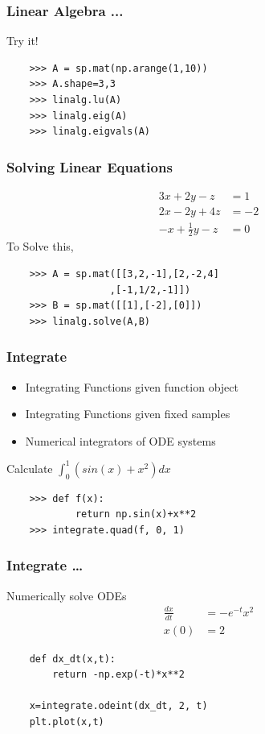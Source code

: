 \documentclass[14pt,compress]{beamer}
\newcounter{time}
\newcommand{\inctime}[1]{\addtocounter{time}{#1}{\tiny \thetime\ m}}
\begin{document}
\begin{frame}[fragile]
  \frametitle{Linear Algebra ...}
  Try it!
  \begin{lstlisting}
    >>> A = sp.mat(np.arange(1,10))
    >>> A.shape=3,3
    >>> linalg.lu(A)
    >>> linalg.eig(A)
    >>> linalg.eigvals(A)
  \end{lstlisting}
\end{frame}

\begin{frame}[fragile]
  \frametitle{Solving Linear Equations}
  \begin{align*}
    3x + 2y - z  & = 1 \\
    2x - 2y + 4z  & = -2 \\
    -x + \frac{1}{2}y -z & = 0
  \end{align*}
  To Solve this, 
  \begin{lstlisting}
    >>> A = sp.mat([[3,2,-1],[2,-2,4]
                  ,[-1,1/2,-1]])
    >>> B = sp.mat([[1],[-2],[0]])
    >>> linalg.solve(A,B)
  \end{lstlisting}
\inctime{15}
\end{frame}

\begin{frame}[fragile]
  \frametitle{Integrate}
  \begin{itemize}
    \item Integrating Functions given function object
    \item Integrating Functions given fixed samples
    \item Numerical integrators of ODE systems
  \end{itemize}
  Calculate $\int^1_0(sin(x) + x^2)dx$
  \begin{lstlisting}
    >>> def f(x):
            return np.sin(x)+x**2
    >>> integrate.quad(f, 0, 1)
  \end{lstlisting}
\end{frame}

\begin{frame}[fragile]
  \frametitle{Integrate \ldots}
  Numerically solve ODEs\\
  \begin{align*}
  \frac{dx}{dt}&=-e^{-t}x^2\\ 
           x(0)&=2    
  \end{align*}
  \begin{lstlisting}
    def dx_dt(x,t):
        return -np.exp(-t)*x**2

    x=integrate.odeint(dx_dt, 2, t)
    plt.plot(x,t)
  \end{lstlisting}
\inctime{10}
\end{frame}
\end{document}
